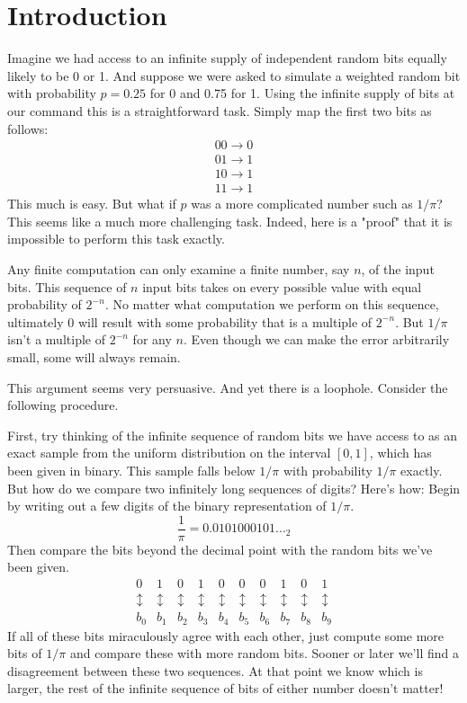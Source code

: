 
\section{Introduction}

Imagine we had access to an infinite supply of independent random bits equally likely to be 0 or 1. And suppose we were asked to simulate a weighted random bit with probability $p=0.25$ for 0 and 0.75 for 1. Using the infinite supply of bits at our command this is a straightforward task. Simply map the first two bits as follows:
\[
\begin{split}
00 \rightarrow 0\\
01 \rightarrow 1\\
10 \rightarrow 1\\
11 \rightarrow 1
\end{split}
\]
This much is easy. But what if $p$ was a more complicated number such as $1/\pi$? This seems like a much more challenging task. Indeed, here is a "proof" that it is impossible to perform this task exactly.

Any finite computation can only examine a finite number, say $n$, of the input bits. This sequence of $n$ input bits takes on every possible value with equal probability of $2^{-n}$. No matter what computation we perform on this sequence, ultimately 0 will result with some probability that is a multiple of $2^{-n}$. But $1/\pi$ isn't a multiple of $2^{-n}$ for any $n$. Even though we can make the error arbitrarily small, some will always remain.

This argument seems very persuasive. And yet there is a loophole. Consider the following procedure.

First, try thinking of the infinite sequence of random bits we have access to as an exact sample from the uniform distribution on the interval $[0,1]$, which has been given in binary. This sample falls below $1/\pi$ with probability $1/\pi$ exactly. But how do we compare two infinitely long sequences of digits? Here's how: Begin by writing out a few digits of the binary representation of $1/\pi$.
$$\frac{1}{\pi} = 0.0101000101..._2$$
Then compare the bits beyond the decimal point with the random bits we've been given.
\[
\begin{matrix}
0 & 1 & 0 & 1 & 0 & 0 & 0 & 1 & 0 & 1\\
\updownarrow & \updownarrow & \updownarrow & \updownarrow & \updownarrow & \updownarrow & \updownarrow & \updownarrow & \updownarrow & \updownarrow \\
b_0 & b_1 & b_2 & b_3 & b_4 & b_5 & b_6 & b_7 & b_8 & b_9
\end{matrix}
\]
If all of these bits miraculously agree with each other, just compute some more bits of $1/\pi$ and compare these with more random bits. Sooner or later we'll find a disagreement between these two sequences. At that point we know which is larger, the rest of the infinite sequence of bits of either number doesn't matter!

